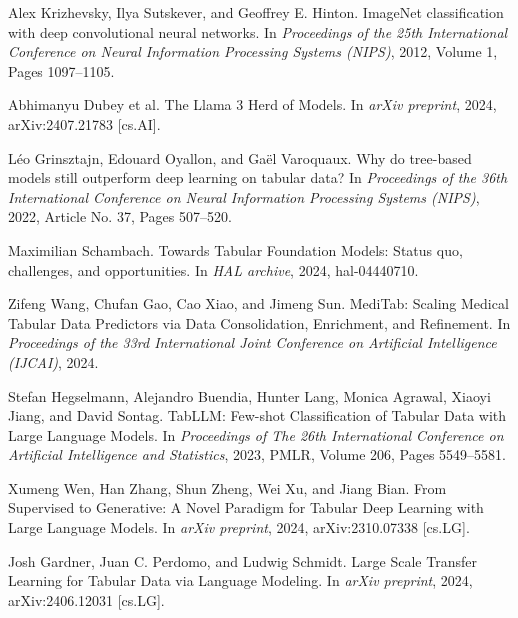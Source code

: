 \documentclass{article}
\begin{document}
\begin{thebibliography}{1}

Alex Krizhevsky, Ilya Sutskever, and Geoffrey E. Hinton.
\newblock ImageNet classification with deep convolutional neural networks.
\newblock In {\em Proceedings of the 25th International Conference on Neural Information Processing Systems (NIPS)}, 2012, Volume 1, Pages 1097--1105.

Abhimanyu Dubey et al.
\newblock The Llama 3 Herd of Models.
\newblock In {\em arXiv preprint}, 2024, arXiv:2407.21783 [cs.AI].

Léo Grinsztajn, Edouard Oyallon, and Gaël Varoquaux.
\newblock Why do tree-based models still outperform deep learning on tabular data?
\newblock In {\em Proceedings of the 36th International Conference on Neural Information Processing Systems (NIPS)}, 2022, Article No. 37, Pages 507--520.

Maximilian Schambach.
\newblock Towards Tabular Foundation Models: Status quo, challenges, and opportunities.
\newblock In {\em HAL archive}, 2024, hal-04440710.

Zifeng Wang, Chufan Gao, Cao Xiao, and Jimeng Sun.
\newblock MediTab: Scaling Medical Tabular Data Predictors via Data Consolidation, Enrichment, and Refinement.
\newblock In {\em Proceedings of the 33rd International Joint Conference on Artificial Intelligence (IJCAI)}, 2024.

Stefan Hegselmann, Alejandro Buendia, Hunter Lang, Monica Agrawal, Xiaoyi Jiang, and David Sontag.
\newblock TabLLM: Few-shot Classification of Tabular Data with Large Language Models.
\newblock In {\em Proceedings of The 26th International Conference on Artificial Intelligence and Statistics}, 2023, PMLR, Volume 206, Pages 5549--5581.

Xumeng Wen, Han Zhang, Shun Zheng, Wei Xu, and Jiang Bian.
\newblock From Supervised to Generative: A Novel Paradigm for Tabular Deep Learning with Large Language Models.
\newblock In {\em arXiv preprint}, 2024, arXiv:2310.07338 [cs.LG].

Josh Gardner, Juan C. Perdomo, and Ludwig Schmidt.
\newblock Large Scale Transfer Learning for Tabular Data via Language Modeling.
\newblock In {\em arXiv preprint}, 2024, arXiv:2406.12031 [cs.LG].


\end{thebibliography}
\end{document}
